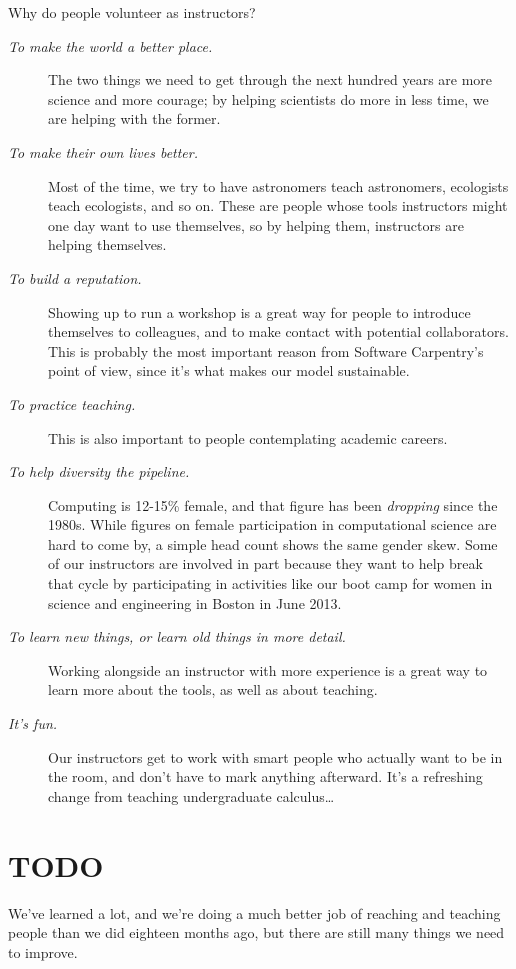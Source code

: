 \documentclass[10pt,a4paper,twocolumn]{article}
\begin{document}
Why do people volunteer as instructors?

\begin{description}
\item[\emph{To make the world a better place.}]
The two things we need to get through the next hundred years are more
science and more courage; by helping scientists do more in less time, we
are helping with the former.
\item[\emph{To make their own lives better.}]
Most of the time, we try to have astronomers teach astronomers,
ecologists teach ecologists, and so on. These are people whose tools
instructors might one day want to use themselves, so by helping them,
instructors are helping themselves.
\item[\emph{To build a reputation.}]
Showing up to run a workshop is a great way for people to introduce
themselves to colleagues, and to make contact with potential
collaborators. This is probably the most important reason from Software
Carpentry's point of view, since it's what makes our model sustainable.
\item[\emph{To practice teaching.}]
This is also important to people contemplating academic careers.
\item[\emph{To help diversity the pipeline.}]
Computing is 12-15\% female, and that figure has been \emph{dropping}
since the 1980s. While figures on female participation in computational
science are hard to come by, a simple head count shows the same gender
skew. Some of our instructors are involved in part because they want to
help break that cycle by participating in activities like our boot camp
for women in science and engineering in Boston in June 2013.
\item[\emph{To learn new things, or learn old things in more detail.}]
Working alongside an instructor with more experience is a great way to
learn more about the tools, as well as about teaching.
\item[\emph{It's fun.}]
Our instructors get to work with smart people who actually want to be in
the room, and don't have to mark anything afterward. It's a refreshing
change from teaching undergraduate calculus\ldots{}
\end{description}

\section*{TODO}

We've learned a lot, and we're doing a much better job of reaching and
teaching people than we did eighteen months ago, but there are still
many things we need to improve.
\end{document}
